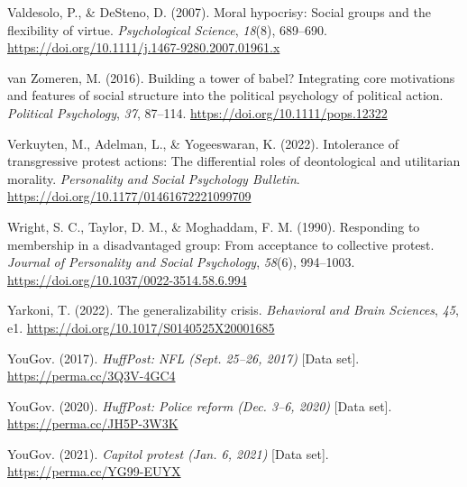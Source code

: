 \documentclass[12pt, letterpaper]{article}
\newenvironment{CSLReferences}[2]{}{}
\begin{document}
\begin{CSLReferences}{1}{0}
\leavevmode{}%
Valdesolo, P., \& DeSteno, D. (2007). Moral hypocrisy: Social groups and
the flexibility of virtue. \emph{Psychological Science}, \emph{18}(8),
689--690. \url{https://doi.org/10.1111/j.1467-9280.2007.01961.x}

\leavevmode{}%
van Zomeren, M. (2016). Building a tower of babel? {Integrating} core
motivations and features of social structure into the political
psychology of political action. \emph{Political Psychology}, \emph{37},
87--114. \url{https://doi.org/10.1111/pops.12322}

\leavevmode{}%
Verkuyten, M., Adelman, L., \& Yogeeswaran, K. (2022). Intolerance of
transgressive protest actions: The differential roles of deontological
and utilitarian morality. \emph{Personality and Social Psychology
Bulletin}. \url{https://doi.org/10.1177/01461672221099709}

\leavevmode{}%
Wright, S. C., Taylor, D. M., \& Moghaddam, F. M. (1990). Responding to
membership in a disadvantaged group: From acceptance to collective
protest. \emph{Journal of Personality and Social Psychology},
\emph{58}(6), 994--1003.
\url{https://doi.org/10.1037/0022-3514.58.6.994}

\leavevmode{}%
Yarkoni, T. (2022). The generalizability crisis. \emph{Behavioral and
Brain Sciences}, \emph{45}, e1.
\url{https://doi.org/10.1017/S0140525X20001685}

\leavevmode{}%
YouGov. (2017). \emph{{HuffPost: NFL} {(Sept. 25--26, 2017)}} {[}Data
set{]}. \url{https://perma.cc/3Q3V-4GC4}

\leavevmode{}%
YouGov. (2020). \emph{{HuffPost}: Police reform {(Dec. 3--6, 2020)}}
{[}Data set{]}. \url{https://perma.cc/JH5P-3W3K}

\leavevmode{}%
YouGov. (2021). \emph{Capitol protest {(Jan. 6, 2021)}} {[}Data set{]}.
\url{https://perma.cc/YG99-EUYX}

\end{CSLReferences}

\endgroup

\newpage

\setcounter{table}{0}
\renewcommand{\thetable}{A\arabic{table}}
\end{document}
